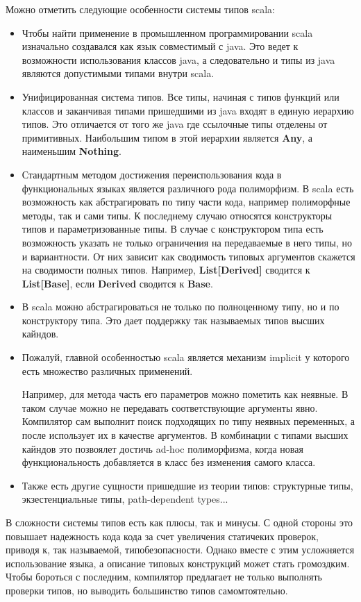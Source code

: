 Можно отметить следующие особенности системы типов scala:
\begin{itemize}
  \item Чтобы найти применение в промышленном программировании scala изначально
  создавался как язык совместимый с java.
  Это ведет к возможности использования классов java, а следовательно и типы
  из java являются допустимыми типами внутри scala.
  \item Унифицированная система типов. Все типы, начиная с типов функций или
  классов и заканчивая типами пришедшими из java входят в единую иерархию типов.
  Это отличается от того же java где ссылочные типы отделены от примитивных.
  Наибольшим типом в этой иерархии является \textbf{Any}, а наименьшим
  \textbf{Nothing}.
  \item Стандартным методом достижения переиспользования кода
  в функциональных языках является различного рода полиморфизм.
  В scala есть возможность как абстрагировать по типу части кода,
  например полиморфные методы, так и сами типы.
  К последнему случаю относятся конструкторы типов и параметризованные типы.
  В случае с конструктором типа есть возможность указать не только ограничения
  на передаваемые в него типы, но и вариантности.
  От них зависит как сводимость типовых аргументов скажется на
  сводимости полных типов.
  Например, \textbf{List[Derived]} сводится к \textbf{List[Base]}, если
  \textbf{Derived} сводится к \textbf{Base}.
  \item В scala можно абстрагироваться не только по полноценному типу,
  но и по конструктору типа.
  Это дает поддержку так называемых типов высших кайндов.
  \item Пожалуй, главной особенностью scala является механизм implicit у которого
  есть множество различных применений.

  Например, для метода часть его параметров можно пометить как неявные.
  В таком случае можно не передавать соответствующие аргументы явно.
  Компилятор сам выполнит поиск подходящих по типу неявных переменных,
  а после использует их в качестве аргументов.
  В комбинации с типами высших кайндов это позвоялет достичь ad-hoc полиморфизма,
  когда новая функциональность добавляется в класс без изменения самого
  класса.
  \item Также есть другие сущности пришедшие из теории типов:
  структурные типы, экзестенциальные типы, path-dependent types...
\end{itemize}

В сложности системы типов есть как плюсы, так и минусы.
С одной стороны это повышает надежность кода кода за счет увеличения статичеких
проверок, приводя к, так называемой, типобезопасности.
Однако вместе с этим усложняется использование языка, а описание типовых
конструкций может стать громоздким.
Чтобы бороться с последним, компилятор предлагает не только выполнять проверки
типов, но выводить большинство типов самомтоятельно.

